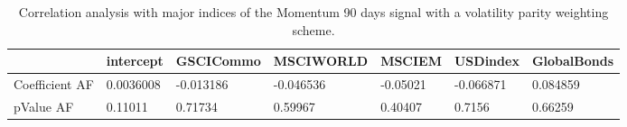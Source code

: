 \begin{table}[H]
\centering
\begin{tabular}{lllllll}
\hline& intercept & GSCICommo & MSCIWORLD & MSCIEM & USDindex & GlobalBonds \\ 
\hline 
Coefficient AF & 0.0036008 & -0.013186 & -0.046536 & -0.05021 & -0.066871 & 0.084859 \\ 
pValue AF & 0.11011 & 0.71734 & 0.59967 & 0.40407 & 0.7156 & 0.66259 \\ 
\hline
\end{tabular}
\caption{Correlation analysis with major indices of the Momentum 90 days signal with a volatility parity weighting scheme.}
\label{MOM90VP_AFACTOR}
\end{table}